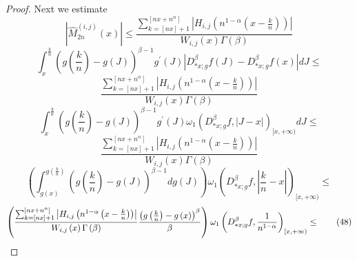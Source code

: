\documentclass[10pt]{NSP1}
\numberwithin{equation}{section}
\begin{document}
\begin{proof}
Next we estimate
\begin{equation*}
\left \vert \widehat{M}_{2n}^{\left( i,j\right) }\left( x\right) \right
\vert \leq \frac{\sum_{k=\left[ nx\right] +1}^{\left[ nx+n^{\alpha }\right]
}\left \vert H_{i,j}\left( n^{1-\alpha }\left( x-\frac{k}{n}\right) \right)
\right \vert }{W_{i,j}\left( x\right) \Gamma \left( \beta \right) }
\end{equation*}
\begin{equation}
\int_{x}^{\frac{k}{n}}\left( g\left( \frac{k}{n}\right) -g\left( J\right)
\right) ^{\beta -1}g^{\prime }\left( J\right) \left \vert D_{\ast
x;g}^{\beta }f\left( J\right) -D_{\ast x;g}^{\beta }f\left( x\right) \right
\vert dJ\leq  \tag{46}  \label{46}
\end{equation}
\begin{equation*}
\frac{\sum_{k=\left[ nx\right] +1}^{\left[ nx+n^{\alpha }\right] }\left
\vert H_{i,j}\left( n^{1-\alpha }\left( x-\frac{k}{n}\right) \right) \right
\vert }{W_{i,j}\left( x\right) \Gamma \left( \beta \right) }
\end{equation*}
\begin{equation*}
\int_{x}^{\frac{k}{n}}\left( g\left( \frac{k}{n}\right) -g\left( J\right)
\right) ^{\beta -1}g^{\prime }\left( J\right) \omega _{1}\left( D_{\ast
x;g}^{\beta }f,\left \vert J-x\right \vert \right) _{[x,+\infty )}dJ\leq
\end{equation*}
\begin{equation}
\frac{\sum_{k=\left[ nx\right] +1}^{\left[ nx+n^{\alpha }\right] }\left
\vert H_{i,j}\left( n^{1-\alpha }\left( x-\frac{k}{n}\right) \right) \right
\vert }{W_{i,j}\left( x\right) \Gamma \left( \beta \right) }  \tag{47}
\label{47}
\end{equation}
\begin{equation*}
\left( \int_{g\left( x\right) }^{g\left( \frac{k}{n}\right) }\left( g\left(
\frac{k}{n}\right) -g\left( J\right) \right) ^{\beta -1}dg\left( J\right)
\right) \omega _{1}\left( D_{\ast x;g}^{\beta }f,\left \vert \frac{k}{n}%
-x\right \vert \right) _{[x,+\infty )}\leq
\end{equation*}
\begin{equation}
\left( \frac{\sum_{k=\left[ nx\right] +1}^{\left[ nx+n^{\alpha }\right]
}\left \vert H_{i,j}\left( n^{1-\alpha }\left( x-\frac{k}{n}\right) \right)
\right \vert }{W_{i,j}\left( x\right) \Gamma \left( \beta \right) }\frac{%
\left( g\left( \frac{k}{n}\right) -g\left( x\right) \right) ^{\beta }}{\beta
}\right) \omega _{1}\left( D_{\ast x;g}^{\beta }f,\frac{1}{n^{1-\alpha }}%
\right) _{[x,+\infty )}\leq  \tag{48}  \label{48}

\end{equation}
\end{proof}
\end{document}
